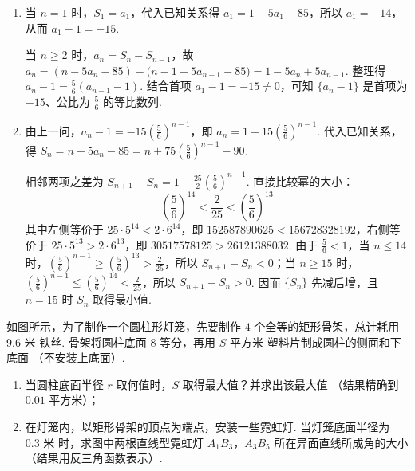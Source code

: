 \begin{solution}
\begin{enumerate}
\item 当 \(n=1\) 时，\(S_1=a_1\)，代入已知关系得 \(a_1=1-5a_1-85\)，所以 \(a_1=-14\)，从而 \(a_1-1=-15\).

当 \(n\geqslant2\) 时，\(a_n=S_n-S_{n-1}\)，故
\(a_n=(n-5a_n-85)-\bigl(n-1-5a_{n-1}-85\bigr)=1-5a_n+5a_{n-1}\).
整理得 \(a_n-1=\frac{5}{6}(a_{n-1}-1)\). 结合首项 \(a_1-1=-15\neq0\)，可知 \(\{a_n-1\}\) 是首项为 \(-15\)、公比为 \(\frac{5}{6}\) 的等比数列.

\item 由上一问，\(a_n-1=-15\left(\frac{5}{6}\right)^{n-1}\)，即
\(a_n=1-15\left(\frac{5}{6}\right)^{n-1}\). 代入已知关系，得
\(S_n=n-5a_n-85=n+75\left(\frac{5}{6}\right)^{n-1}-90\).

相邻两项之差为 \(S_{n+1}-S_n=1-\frac{25}{2}\left(\frac{5}{6}\right)^{n-1}\). 直接比较幂的大小：
\[
\left(\frac{5}{6}\right)^{14}<\frac{2}{25}<\left(\frac{5}{6}\right)^{13}
\]
其中左侧等价于 \(25\cdot5^{14}<2\cdot6^{14}\)，即 \(152587890625<156728328192\)，右侧等价于 \(25\cdot5^{13}>2\cdot6^{13}\)，即 \(30517578125>26121388032\).
由于 \(\frac{5}{6}<1\)，当 \(n\leqslant14\) 时，\(\left(\frac{5}{6}\right)^{n-1}\geqslant\left(\frac{5}{6}\right)^{13}>\frac{2}{25}\)，所以 \(S_{n+1}-S_n<0\)；当 \(n\geqslant15\) 时，\(\left(\frac{5}{6}\right)^{n-1}\leqslant\left(\frac{5}{6}\right)^{14}<\frac{2}{25}\)，所以 \(S_{n+1}-S_n>0\). 因而 \(\{S_n\}\) 先减后增，且 \(n=15\) 时 \(S_n\) 取得最小值.
\end{enumerate}
\end{solution}

\begin{problem}
如图所示，为了制作一个圆柱形灯笼，先要制作 \(4\) 个全等的矩形骨架，总计耗用 \(9.6\text{ 米}\) 铁丝. 骨架将圆柱底面 \(8\) 等分，再用 \(S\text{ 平方米}\) 塑料片制成圆柱的侧面和下底面 （不安装上底面）.

\begin{enumerate}
\item 当圆柱底面半径 \(r\) 取何值时，\(S\) 取得最大值？并求出该最大值 （结果精确到 \(0.01\text{ 平方米}\)）；
    \item 在灯笼内，以矩形骨架的顶点为端点，安装一些霓虹灯. 当灯笼底面半径为 \(0.3\text{ 米}\) 时，求图中两根直线型霓虹灯 \(A_{1}B_{3}\)，\(A_{3}B_{5}\) 所在异面直线所成角的大小 （结果用反三角函数表示）.
\end{enumerate}

\end{problem}

